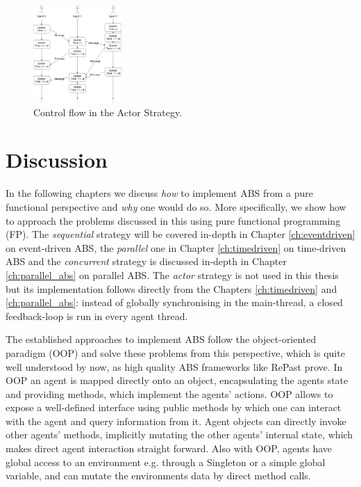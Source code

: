\begin{figure}[H]
	\centering
	\includegraphics[width=0.3\textwidth, angle=0]{./fig/implabs/actor.png}
	\caption{Control flow in the Actor Strategy.}
	\label{fig:strategy_act}
\end{figure}

\section{Discussion}
In the following chapters we discuss \textit{how} to implement ABS from a pure functional perspective and \textit{why} one would do so. More specifically, we show how to approach the problems discussed in this using pure functional programming (FP). The \textit{sequential} strategy will be covered in-depth in Chapter \ref{ch:eventdriven} on event-driven ABS, the \textit{parallel} one in Chapter \ref{ch:timedriven} on time-driven ABS and the \textit{concurrent} strategy is discussed in-depth in Chapter \ref{ch:parallel_abs} on parallel ABS. The \textit{actor} strategy is not used in this thesis but its implementation follows directly from the Chapters \ref{ch:timedriven} and \ref{ch:parallel_abs}: instead of globally synchronising in the main-thread, a closed feedback-loop is run in every agent thread. 

The established approaches to implement ABS follow the object-oriented paradigm (OOP) and solve these problems from this perspective, which is quite well understood by now, as high quality ABS frameworks like RePast \cite{north_complex_2013} prove. In OOP an agent is mapped directly onto an object, encapsulating the agents state and providing methods, which implement the agents' actions. OOP allows to expose a well-defined interface using public methods by which one can interact with the agent and query information from  it. Agent objects can directly invoke other agents' methods, implicitly mutating the other agents' internal state, which makes direct agent interaction straight forward. Also with OOP, agents have global access to an environment e.g. through a Singleton or a simple global variable, and can mutate the environments data by direct method calls.

